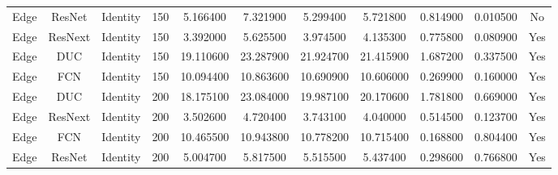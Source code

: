 \begin{tabular}{|c||c||c||c||c||c||c||c||c||c||c|}
Edge & ResNet & Identity & 150 & 5.166400 & 7.321900 & 5.299400 & 5.721800 & 0.814900 & 0.010500 & No \\
Edge & ResNext & Identity & 150 & 3.392000 & 5.625500 & 3.974500 & 4.135300 & 0.775800 & 0.080900 & Yes \\
Edge & DUC & Identity & 150 & 19.110600 & 23.287900 & 21.924700 & 21.415900 & 1.687200 & 0.337500 & Yes \\
Edge & FCN & Identity & 150 & 10.094400 & 10.863600 & 10.690900 & 10.606000 & 0.269900 & 0.160000 & Yes \\
Edge & DUC & Identity & 200 & 18.175100 & 23.084000 & 19.987100 & 20.170600 & 1.781800 & 0.669000 & Yes \\
Edge & ResNext & Identity & 200 & 3.502600 & 4.720400 & 3.743100 & 4.040000 & 0.514500 & 0.123700 & Yes \\
Edge & FCN & Identity & 200 & 10.465500 & 10.943800 & 10.778200 & 10.715400 & 0.168800 & 0.804400 & Yes \\
Edge & ResNet & Identity & 200 & 5.004700 & 5.817500 & 5.515500 & 5.437400 & 0.298600 & 0.766800 & Yes \\
\bottomrule
\end{tabular}

